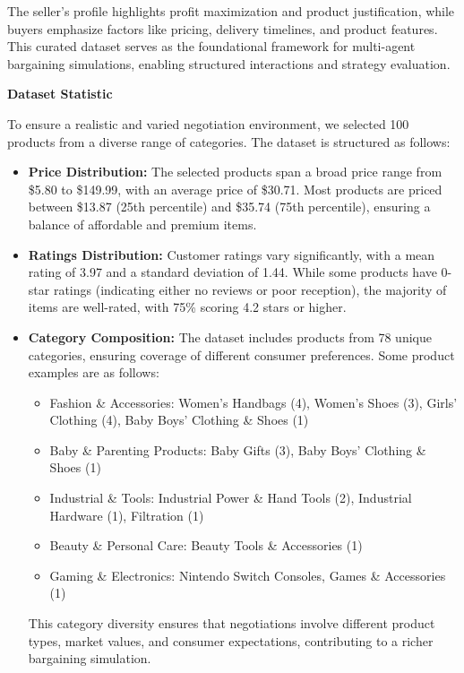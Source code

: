 The seller’s profile highlights profit maximization and product justification, while buyers emphasize factors like pricing, delivery timelines, and product features. This curated dataset serves as the foundational framework for multi-agent bargaining simulations, enabling structured interactions and strategy evaluation. 

\textbf{Dataset Statistic}

To ensure a realistic and varied negotiation environment, we selected 100 products from a diverse range of categories. The dataset is structured as follows:

\begin{itemize}
    \item \textbf{Price Distribution:} 
    The selected products span a broad price range from \$5.80 to \$149.99, with an average price of \$30.71. Most products are priced between \$13.87 (25th percentile) and \$35.74 (75th percentile), ensuring a balance of affordable and premium items.
    
    \item \textbf{Ratings Distribution:} 
    Customer ratings vary significantly, with a mean rating of 3.97 and a standard deviation of 1.44. While some products have 0-star ratings (indicating either no reviews or poor reception), the majority of items are well-rated, with 75\% scoring 4.2 stars or higher.
    
    \item \textbf{Category Composition:} 
    The dataset includes products from 78 unique categories, ensuring coverage of different consumer preferences. Some product examples are as follows:
    
    \begin{itemize}
        \item Fashion \& Accessories: Women's Handbags (4), Women's Shoes (3), Girls' Clothing (4), Baby Boys' Clothing \& Shoes (1)
        \item Baby \& Parenting Products: Baby Gifts (3), Baby Boys' Clothing \& Shoes (1)
        \item Industrial \& Tools: Industrial Power \& Hand Tools (2), Industrial Hardware (1), Filtration (1)
        \item Beauty \& Personal Care: Beauty Tools \& Accessories (1)
        \item Gaming \& Electronics: Nintendo Switch Consoles, Games \& Accessories (1)
    \end{itemize}

This category diversity ensures that negotiations involve different product types, market values, and consumer expectations, contributing to a richer bargaining simulation.


\end{itemize}
